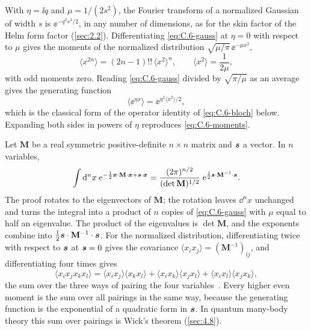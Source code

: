 With $\eta = \ii q$ and $\mu = 1/(2s^2)$, the Fourier transform of a normalized Gaussian of width $s$ is $\ee^{-q^2s^2/2}$, in any number of dimensions, as for the skin factor of the Helm form factor (\cref{sec:2.2}). Differentiating \cref{eq:C.6-gauss} at $\eta = 0$ with respect to $\mu$ gives the moments of the normalized distribution $\sqrt{\mu/\pi}\,\ee^{-\mu x^2}$,
\begin{equation}
  \langle x^{2n}\rangle = (2n - 1)!!\,\langle x^2\rangle^n, \qquad \langle x^2\rangle = \frac{1}{2\mu} ,
  \label{eq:C.6-moments}
\end{equation}
with odd moments zero. Reading \cref{eq:C.6-gauss} divided by $\sqrt{\pi/\mu}$ as an average gives the generating function
\begin{equation}
  \langle\ee^{\eta x}\rangle = \ee^{\eta^2\langle x^2\rangle/2} ,
  \label{eq:C.6-generating}
\end{equation}
which is the classical form of the operator identity of \cref{eq:C.6-bloch} below. Expanding both sides in powers of $\eta$ reproduces \cref{eq:C.6-moments}.

Let $\mathbf{M}$ be a real symmetric positive-definite $n\times n$ matrix and $\bm{s}$ a vector. In $n$ variables,
\begin{equation}
  \int\mathrm{d}^nx\;\mathrm{e}^{-\frac12\bm{x}\cdot\mathbf{M}\cdot\bm{x} + \bm{s}\cdot\bm{x}} = \frac{(2\pi)^{n/2}}{(\det\mathbf{M})^{1/2}}\;\mathrm{e}^{\frac12\bm{s}\cdot\mathbf{M}^{-1}\cdot\bm{s}} .
  \label{eq:C.6-gaussn}
\end{equation}
The proof rotates to the eigenvectors of $\mathbf{M}$; the rotation leaves $\dd^nx$ unchanged and turns the integral into a product of $n$ copies of \cref{eq:C.6-gauss} with $\mu$ equal to half an eigenvalue. The product of the eigenvalues is $\det\mathbf{M}$, and the exponents combine into $\tfrac12\bm{s}\cdot\mathbf{M}^{-1}\cdot\bm{s}$. For the normalized distribution, differentiating twice with respect to $\bm{s}$ at $\bm{s} = 0$ gives the covariance $\langle x_ix_j\rangle = (\mathbf{M}^{-1})_{ij}$, and differentiating four times gives
\begin{equation}
  \langle x_ix_jx_kx_l\rangle = \langle x_ix_j\rangle\langle x_kx_l\rangle + \langle x_ix_k\rangle\langle x_jx_l\rangle + \langle x_ix_l\rangle\langle x_jx_k\rangle ,
  \label{eq:C.6-isserlis}
\end{equation}
the sum over the three ways of pairing the four variables~\cite{isserlis1918formula}. Every higher even moment is the sum over all pairings in the same way, because the generating function is the exponential of a quadratic form in $\bm{s}$. In quantum many-body theory this sum over pairings is Wick's theorem (\cref{sec:4.8}).

